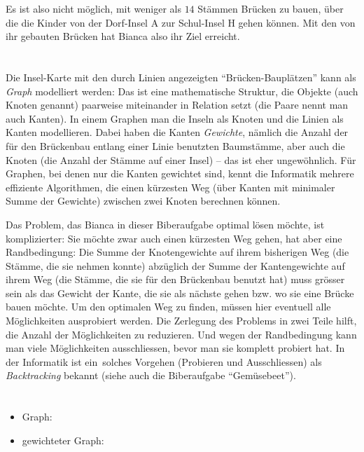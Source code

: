 {{Es ist also nicht möglich, mit weniger als $14$ Stämmen Brücken zu bauen, über die die Kinder von der Dorf-Insel A zur Schul-Insel H gehen können.  Mit den von ihr gebauten Brücken hat Bianca also ihr Ziel erreicht.



\section*{\BrochureItsInformatics}
Die Insel-Karte mit den durch Linien angezeigten \enquote{Brücken-Bauplätzen} kann als \emph{Graph} modelliert werden:  Das ist eine mathematische Struktur, die Objekte (auch Knoten genannt) paarweise miteinander in Relation setzt (die Paare nennt man auch Kanten).  In einem Graphen man die Inseln als Knoten und die Linien als Kanten modellieren.  Dabei haben die Kanten \emph{Gewichte}, nämlich die Anzahl der für den Brückenbau entlang einer Linie benutzten Baumstämme, aber auch die Knoten (die Anzahl der Stämme auf einer Insel) – das ist eher ungewöhnlich.  Für Graphen, bei denen nur die Kanten gewichtet sind, kennt die Informatik mehrere effiziente Algorithmen, die einen kürzesten Weg (über Kanten mit minimaler Summe der Gewichte) zwischen zwei Knoten berechnen können.

Das Problem, das Bianca in dieser Biberaufgabe optimal lösen möchte, ist komplizierter:  Sie möchte zwar auch einen kürzesten Weg gehen, hat aber eine Randbedingung:  Die Summe der Knotengewichte auf ihrem bisherigen Weg (die Stämme, die sie nehmen konnte) abzüglich der Summe der Kantengewichte auf ihrem Weg (die Stämme, die sie für den Brückenbau benutzt hat) muss grösser sein als das Gewicht der Kante, die sie als nächste gehen bzw. wo sie eine Brücke bauen möchte.  Um den optimalen Weg zu finden, müssen hier eventuell alle Möglichkeiten ausprobiert werden.  Die Zerlegung des Problems in zwei Teile hilft, die Anzahl der Möglichkeiten zu reduzieren.  Und wegen der Randbedingung kann man viele Möglichkeiten ausschliessen, bevor man sie komplett probiert hat.  In der Informatik ist ein~solches Vorgehen (Probieren und Ausschliessen) als \emph{Backtracking} bekannt (siehe auch die Biberaufgabe \enquote{Gemüsebeet}).



\section*{\BrochureWebsitesAndKeywords}
{\raggedright
\begin{itemize}
  \item Graph: \href{https://de.wikipedia.org/wiki/Graph_(Graphentheorie)}{}
  \item gewichteter Graph: \href{https://de.wikipedia.org/wiki/Kantengewichteter_Graph}{}
\end{itemize}


}}}
